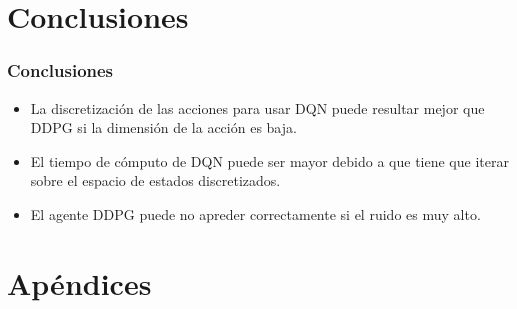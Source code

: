 \documentclass[
    11pt,
    aspectratio=169,
]{beamer}
\begin{document}
\section{Conclusiones}

\begin{frame}
\frametitle{Conclusiones}

\begin{itemize}
\item La discretización de las acciones para usar DQN puede resultar mejor que DDPG si la dimensión de la acción es baja.
\item El tiempo de cómputo de DQN puede ser mayor debido a que tiene que iterar sobre el espacio de estados discretizados.
\item El agente DDPG puede no apreder correctamente si el ruido es muy alto.
\end{itemize}

\end{frame}

\section{Apéndices}
\end{document}

